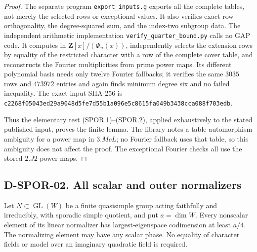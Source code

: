 \begin{proof}
The separate program \texttt{export\_inputs.g} exports all the
complete tables, not merely the selected rows or exceptional values.
It also verifies exact row orthogonality, the degree-squared sum,
and the index-two subgroup data.  The independent arithmetic
implementation \texttt{verify\_quarter\_bound.py} calls no GAP
code.  It computes in $\mathbf Z[x]/(\Phi_n(x))$, independently
selects the extension rows by equality of the restricted character
with a row of the complete cover table, and reconstructs the
Fourier multiplicities from prime power maps.  Its different
polynomial basis needs only twelve Fourier fallbacks; it verifies
the same $3035$ rows and $473972$ entries and again finds minimum
degree six and no failed inequality.  The exact input SHA-256 is
\texttt{c2268f05043ed29a9048d5fe7d55b1a096e5c8615fa049b3438cca088f703edb}.

Thus the elementary test (SPOR.1)--(SPOR.2), applied exhaustively
to the stated published input, proves the finite lemma.  The
library notes a table-automorphism ambiguity for a power map in
$3.McL$; no Fourier fallback uses that table, so this ambiguity
does not affect the proof.  The exceptional Fourier checks all
use the stored $2.J2$ power maps.
\end{proof}

\subsection*{D-SPOR-02. All scalar and outer normalizers}

\begin{proposition}\label{D-SPOR-02}
Let $N\subset\operatorname{GL}(W)$ be a finite quasisimple group
acting faithfully and irreducibly, with sporadic simple quotient,
and put $a=\dim W$.  Every nonscalar element of its linear
normalizer has largest-eigenspace codimension at least $a/4$.
The normalizing element may have any scalar phase.  No equality
of character fields or model over an imaginary quadratic field
is required.
\end{proposition}

